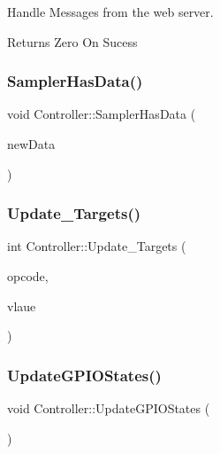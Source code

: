 Handle Messages from the web server.

\begin{DoxyReturn}{Returns}
Zero On Sucess 
\end{DoxyReturn}
\mbox{\label{classController_a4b765eaaf8f72e964118967f86c265e2}} 
\subsubsection{\texorpdfstring{Sampler\+Has\+Data()}{SamplerHasData()}}
{\footnotesize\ttfamily void Controller\+::\+Sampler\+Has\+Data (\begin{DoxyParamCaption}\item[{\hyperlink{structEnvironmentData}{Environment\+Data}}]{new\+Data }\end{DoxyParamCaption})}

\mbox{\label{classController_a0eb08a1d38b2c79e2d140476fd097f24}} 
\subsubsection{\texorpdfstring{Update\+\_\+\+Targets()}{Update\_Targets()}}
{\footnotesize\ttfamily int Controller\+::\+Update\+\_\+\+Targets (\begin{DoxyParamCaption}\item[{uint8\+\_\+t}]{opcode,  }\item[{float}]{vlaue }\end{DoxyParamCaption})}

\mbox{\label{classController_a841b5219b4f48dbfd7b01fab727e7a2c}} 
\subsubsection{\texorpdfstring{Update\+G\+P\+I\+O\+States()}{UpdateGPIOStates()}}
{\footnotesize\ttfamily void Controller\+::\+Update\+G\+P\+I\+O\+States (\begin{DoxyParamCaption}{ }\end{DoxyParamCaption})}

